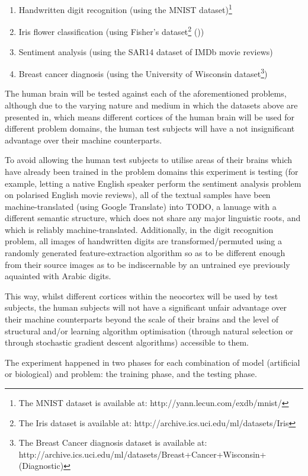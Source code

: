 \documentclass[]{report}
\begin{document}
\begin{enumerate}
	\item Handwritten digit recognition (using the MNIST dataset)\footnote{The MNIST dataset is available at: http://yann.lecun.com/exdb/mnist/}
	\item Iris flower classification (using Fisher's dataset\footnote{The Iris dataset is available at: http://archive.ics.uci.edu/ml/datasets/Iris} (\cite{uciml2007}))
	\item Sentiment analysis (using the SAR14 dataset of IMDb movie reviews)
	\item Breast cancer diagnosis (using the University of Wisconsin dataset\footnote{The Breast Cancer diagnosis dataset is available at: http://archive.ics.uci.edu/ml/datasets/Breast+Cancer+Wisconsin+(Diagnostic)})
\end{enumerate}

The human brain will be tested against each of the aforementioned problems, although due to the varying nature and medium in which the datasets above are presented in, which means different cortices of the human brain will be used for different problem domains, the human test subjects will have a not insignificant advantage over their machine counterparts.

To avoid allowing the human test subjects to utilise areas of their brains which have already been trained in the problem domains this experiment is testing (for example, letting a native English speaker perform the sentiment analysis problem on polarised English movie reviews), all of the textual samples have been machine-translated (using Google Translate) into TODO, a lanuage with a different semantic structure, which does not share any major linguistic roots, and which is reliably machine-translated. Additionally, in the digit recognition problem, all images of handwritten digits are transformed/permuted using a randomly generated feature-extraction algorithm so as to be different enough from their source images as to be indiscernable by an untrained eye previously aquainted with Arabic digits.

This way, whilst different cortices within the neocortex will be used by test subjects, the human subjects will not have a significant unfair advantage over their machine counterparts beyond the scale of their brains and the level of structural and/or learning algorithm optimisation (through natural selection or through stochastic gradient descent algorithms) accessible to them.

The experiment happened in two phases for each combination of model (artificial or biological) and problem: the training phase, and the testing phase.
\end{document}

